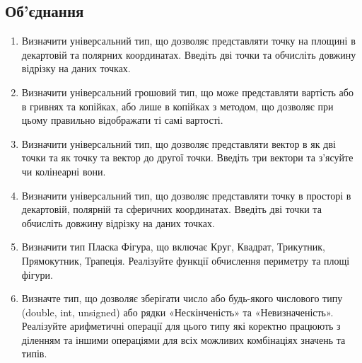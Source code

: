 \documentclass[]{article}
\begin{document}
\subsection{ Об'єднання}
\begin{enumerate}
\item
Визначити універсальний тип, що дозволяє представляти точку на площині в
декартовій та полярних координатах. Введіть дві точки та обчисліть
довжину відрізку на даних точках.
\item
Визначити універсальний грошовий тип, що може представляти вартість або
в гривнях та копійках, або лише в копійках з методом, що дозволяє при
цьому правильно відображати ті самі вартості.
\item
Визначити універсальний тип, що дозволяє представляти вектор в як дві
точки та як точку та вектор до другої точки. Введіть три вектори та
з'ясуйте чи колінеарні вони.
\item
Визначити універсальний тип, що дозволяє представляти точку в просторі в
декартовій, полярній та сферичних координатах. Введіть дві точки та
обчисліть довжину відрізку на даних точках.
\item
Визначити тип Пласка Фігура, що включає Круг, Квадрат, Трикутник,
Прямокутник, Трапеція. Реалізуйте функції обчислення периметру та площі
фігури.
\item
Визначте тип, що дозволяє зберігати число або будь-якого числового типу
(double, int, unsigned) або рядки «Нескінченість» та «Невизначеність».
Реалізуйте арифметичні операції для цього типу які коректно працюють з
діленням та іншими операціями для всіх можливих комбінаціях значень та
типів.
\end{enumerate}
\end{document}
